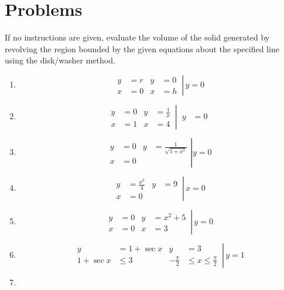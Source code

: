\documentclass[12pt, A4]{report}
\begin{document}
		\section*{Problems}
			If no instructions are given, evaluate the volume of the solid generated by revolving the region bounded by the given equations about the specified line using the disk/washer method.
			\begin{enumerate}
				\item
					\[
						\left.\begin{aligned}
							y &= r &
								y &= 0 \\
							x &= 0 & 
								x &= h
						\end{aligned}\,\right|\, y = 0
					\]
				\item
					\[
						\left.\begin{aligned}
							y &= 0 &
								y &= \frac{1}{x} \\
							x &= 1 &
								x &= 4
						\end{aligned}\,\right|\, 
						\begin{aligned}
 							y &= 0
 						\end{aligned}
					\]
				\item
					\[
						\left.\begin{aligned}
							y &= 0 & 
								y &= \frac{1}{\sqrt{1 + x^2}} \\
							x &= 0 
						\end{aligned}\right| y = 0
					\]
				\item
					\[
						\left.\begin{aligned}
							y &= \frac{x^2}{4} &
								y &= 9 \\
							x &= 0
						\end{aligned}\,\right|\, x = 0
					\]
				\item
					\[
						\left.\begin{aligned}
							y &= 0 & 
								y &= x^2 + 5 \\
							x &= 0 &
								x &= 3
						\end{aligned}\,\right|\, y = 0
					\]
				\item
					\[
						\left.\begin{aligned}
							y &= 1 + \sec x &
								y &= 3 \\
							1 + \sec x &\le 3 &
								-\frac{\pi}{2} &\le x \le \frac{\pi}{2}
						\end{aligned}\,\right|\, y = 1
					\]
				\item
					\[
						\left.\begin{aligned}

\end{aligned}\]
\end{enumerate}
\end{document}
